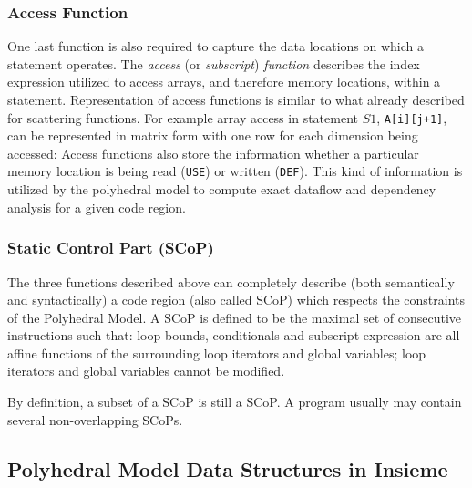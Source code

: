 \subsubsection{Access Function}
One last function is also required to capture the data locations on which a
statement operates. The \emph{access} (or \emph{subscript}) \emph{function} 
describes the index expression utilized to access arrays, and therefore memory
locations, within a statement. Representation of access functions is similar to
what already described for scattering functions. For example array 
access in statement $S1$, \texttt{A[i][j+1]}, can be represented in matrix form
with one row for each dimension being accessed:
Access functions also store the information whether a particular memory location
is being read (\texttt{USE}) or written (\texttt{DEF}). This kind of
information is utilized by the polyhedral model to compute exact dataflow and
dependency analysis for a given code region. 

\subsubsection{Static Control Part (SCoP)}

The three functions described above can completely describe (both semantically
and syntactically) a code region (also called SCoP) which respects the
constraints of the Polyhedral Model. A SCoP is defined to be the maximal set of
consecutive instructions such that: loop bounds, conditionals and subscript
expression are all affine functions of the surrounding loop iterators and global
variables; loop iterators and global variables cannot be modified. 

By definition, a subset of a SCoP is still a SCoP. A program usually may contain
several non-overlapping SCoPs. 

\subsection{Polyhedral Model Data Structures in Insieme}

